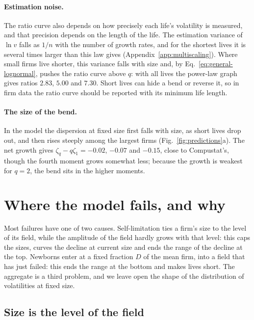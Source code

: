 \documentclass[pre,twocolumn,superscriptaddress,nofootinbib]{revtex4-2}
\begin{document}
\paragraph{Estimation noise.}  The ratio curve also depends on how precisely each life's volatility is measured, and
that precision depends on the length of the life.  The estimation variance of $\ln v$ falls as $1/n$ with the number
of growth rates, and for the shortest lives it is several times larger than this law gives
(Appendix~\ref{app:multiscaling}).  Where small firms live shorter, this variance falls with size and, by
Eq.~\eqref{eq:general-lognormal}, pushes the ratio curve above $q$: with all lives the power-law graph gives ratios
$2.83$, $5.00$ and $7.30$.  Short lives can hide a bend or reverse it, so in firm data the ratio curve should be
reported with its minimum life length.

\paragraph{The size of the bend.}  In the model the dispersion at fixed size first falls with size, as short
lives drop out, and then rises steeply among the largest firms (Fig.~\ref{fig:predictions}a).  The net growth
gives $\zeta_q-q\zeta_1=-0.02$, $-0.07$ and $-0.15$, close to Compustat's, though the fourth moment grows somewhat
less; because the growth is weakest for $q=2$, the bend sits in the higher moments.

\section{Where the model fails, and why}
\label{sec:fails}

Most failures have one of two causes.  Self-limitation ties a firm's size to the level of its field, while the
amplitude of the field hardly grows with that level: this caps the sizes, curves the decline at current size and
ends the range of the decline at the top.  Newborns enter at a fixed fraction $D$ of the mean firm, into a field that
has just failed: this ends the range at the bottom and makes lives short.  The aggregate is a third problem, and we
leave open the shape of the distribution of volatilities at fixed size.

\subsection{Size is the level of the field}
\label{sec:level}
\end{document}
